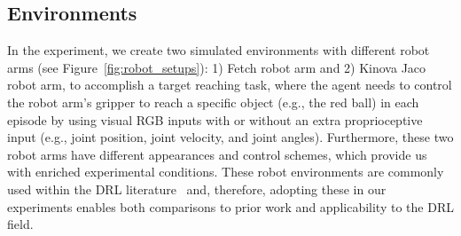 \subsection{Environments}
In the experiment, we create two simulated environments with different robot arms (see Figure~\ref{fig:robot_setups}): 1) Fetch robot arm and 2) Kinova Jaco robot arm, to accomplish a target reaching task, where the agent needs to control the robot arm's gripper to reach a specific object (e.g., the red ball) in each episode by using visual RGB inputs with or without an extra proprioceptive input (e.g., joint position, joint velocity, and joint angles). Furthermore, these two robot arms have different appearances and control schemes, which provide us with enriched experimental conditions.
These robot environments are commonly used within the DRL literature~\cite{andrychowicz2017hindsight, gu2017deep, rusu2017sim} and, therefore, adopting these in our experiments enables both comparisons to prior work and applicability to the DRL field.

